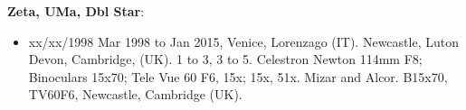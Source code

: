 {\bf Zeta, UMa, Dbl Star}:
\begin{itemize}
\item xx/xx/1998 Mar 1998 to Jan 2015, Venice, Lorenzago (IT). Newcastle, Luton Devon, Cambridge, (UK). 1 to 3, 3 to 5. Celestron Newton 114mm F8; Binoculars 15x70; Tele Vue 60 F6, 15x; 15x, 51x. Mizar and Alcor. B15x70, TV60F6, Newcastle, Cambridge (UK).
\end{itemize}
